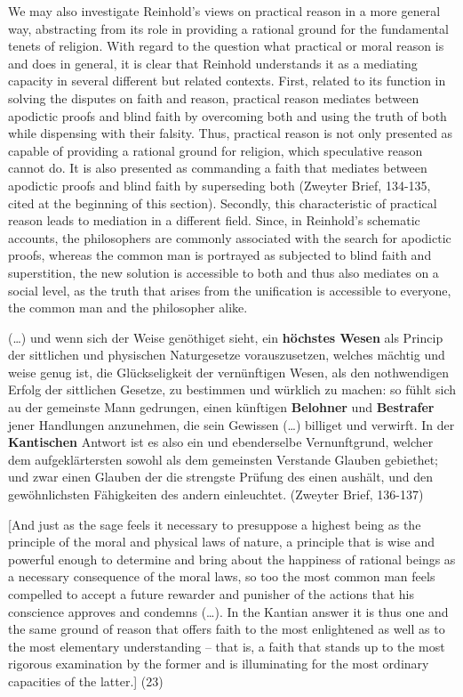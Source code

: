 We may also investigate Reinhold's views on practical reason in a more general way, abstracting from its role in providing a rational ground for the fundamental tenets of religion. With regard to the question what practical or moral reason is and does in general, it is clear that Reinhold understands it as a mediating capacity in several different but related contexts. First, related to its function in solving the disputes on faith and reason, practical reason mediates between apodictic proofs and blind faith by overcoming both and using the truth of both while dispensing with their falsity. Thus, practical reason is not only presented as capable of providing a rational ground for religion, which speculative reason cannot do. It is also presented as commanding a faith that mediates between apodictic proofs and blind faith by superseding both (Zweyter Brief, 134{-}135, cited at the beginning of this section). Secondly, this characteristic of practical reason leads to mediation in a different field. Since, in Reinhold's schematic accounts, the philosophers are commonly associated with the search for apodictic proofs, whereas the common man is portrayed as subjected to blind faith and superstition, the new solution is accessible to both and thus also mediates on a social level, as the truth that arises from the unification is accessible to everyone, the common man and the philosopher alike.

(\ldots ) und wenn sich der Weise gen\"{o}thiget sieht, ein \textbf{h\"{o}chstes Wesen} als Princip der sittlichen und physischen Naturgesetze vorauszusetzen, welches m\"{a}chtig und weise genug ist, die Gl\"{u}ckseligkeit der vern\"{u}nftigen Wesen, als den nothwendigen Erfolg der sittlichen Gesetze, zu bestimmen und w\"{u}rklich zu machen: so f\"{u}hlt sich au der gemeinste Mann gedrungen, einen k\"{u}nftigen \textbf{Belohner }und \textbf{Bestrafer }jener Handlungen anzunehmen, die sein Gewissen (\ldots ) billiget und verwirft. In der \textbf{Kantischen }Antwort ist es also ein und ebenderselbe Vernunftgrund, welcher dem aufgekl\"{a}rtersten sowohl als dem gemeinsten Verstande Glauben gebiethet; und zwar einen Glauben der die strengste Pr\"{u}fung des einen aush\"{a}lt, und den gew\"{o}hnlichsten F\"{a}higkeiten des andern einleuchtet. (Zweyter Brief, 136{-}137)

[And just as the sage feels it necessary to presuppose a highest being as the principle of the moral and physical laws of nature, a principle that is wise and powerful enough to determine and bring about the happiness of rational beings as a necessary consequence of the moral laws, so too the most common man feels compelled to accept a future rewarder and punisher of the actions that his conscience approves and condemns (\ldots ). In the Kantian answer it is thus one and the same ground of reason that offers faith to the most enlightened as well as to the most elementary understanding {--} that is, a faith that stands up to the most rigorous examination by the former and is illuminating for the most ordinary capacities of the latter.] (23) 


